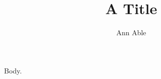 \documentclass{amsart}
\begin{document}
\title{A Title}
\author{Ann Able}
\maketitle
Body.
\end{document}
